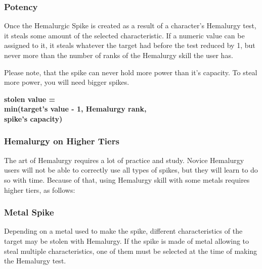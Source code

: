 \subsubsection{Potency}

Once the Hemalurgic Spike is created as a result of a character's Hemalurgy test, it steals some amount of the selected characteristic. If a numeric value can be assigned to it, it steals whatever the target had before the test reduced by 1, but never more than the number of ranks of the Hemalurgy skill the user has.

Please note, that the spike can never hold more power than it's capacity. To steal more power, you will need bigger spikes.

\begin{center}
	\textbf{stolen value = \\min(target's value - 1, Hemalurgy rank, \\spike's capacity)}
\end{center}



\subsubsection{Hemalurgy on Higher Tiers}

The art of Hemalurgy requires a lot of practice and study. Novice Hemalurgy users will not be able to correctly use all types of spikes, but they will learn to do so with time. Because of that, using Hemalurgy skill with some metals requires higher tiers, as follows:


\subsubsection{Metal Spike}

Depending on a metal used to make the spike, different characteristics of the target may be stolen with Hemalurgy. If the spike is made of metal allowing to steal multiple characteristics, one of them must be selected at the time of making the Hemalurgy test.

